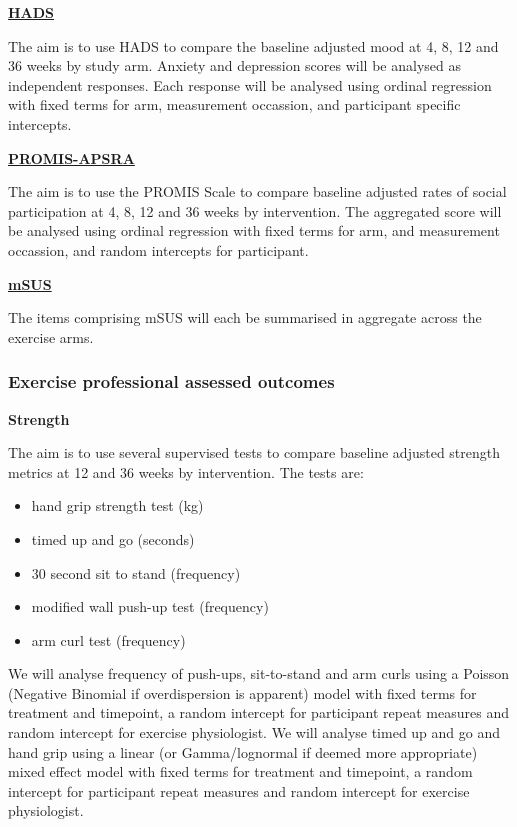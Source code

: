 \documentclass[11pt,parskip=half-]{scrartcl}
\providecommand{\tightlist}{%
  \setlength{\itemsep}{0pt}\setlength{\parskip}{0pt}}
\begin{document}
\label{analysis:hads}
\hyperref[outcome:hads]{\textbf{HADS}}

The aim is to use HADS to compare the baseline adjusted mood at 4, 8, 12 and 36 weeks by study arm. Anxiety and depression scores will be analysed as independent responses. Each response will be analysed using ordinal regression with fixed terms for arm, measurement occassion, and participant specific intercepts.

\label{analysis:promis-aspra}
\hyperref[outcome:promis-apsra]{\textbf{PROMIS-APSRA}}

The aim is to use the PROMIS Scale to compare baseline adjusted rates of social participation at 4, 8, 12 and 36 weeks by intervention. The aggregated score will be analysed using ordinal regression with fixed terms for arm, and measurement occassion, and random intercepts for participant.

\label{analysis:msus}
\hyperref[outcome:msus]{\textbf{mSUS}}

The items comprising mSUS will each be summarised in aggregate across the exercise arms.


\subsubsection{Exercise professional assessed outcomes}\label{exercise-professional-assessed-outcomes}

\textbf{Strength}

The aim is to use several supervised tests to compare baseline adjusted strength metrics at 12 and 36 weeks by intervention. The tests are:

\begin{itemize}
  \tightlist
  \item hand grip strength test (kg)
  \item timed up and go (seconds)
  \item 30 second sit to stand (frequency)
  \item modified wall push-up test (frequency)
  \item arm curl test (frequency)

\end{itemize}

We will analyse frequency of push-ups, sit-to-stand and arm curls using a Poisson (Negative Binomial if overdispersion is apparent) model with fixed terms for treatment and timepoint, a random intercept for participant repeat measures and random intercept for exercise physiologist. We will analyse timed up and go and hand grip using a linear (or Gamma/lognormal if deemed more appropriate) mixed effect model with fixed terms for treatment and timepoint, a random intercept for participant repeat measures and random intercept for exercise physiologist.
\end{document}
